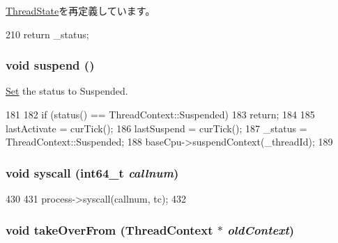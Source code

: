 \hyperlink{structThreadState_a2ad9e92a82d6f783b3061584729c2f4a}{ThreadState}を再定義しています。


\begin{DoxyCode}
210 { return _status; }
\end{DoxyCode}
\hypertarget{classSimpleThread_a3605b58fb45d69d498721bc2f2a14b1c}{
\subsubsection[{suspend}]{\setlength{\rightskip}{0pt plus 5cm}void suspend ()}}
\label{classSimpleThread_a3605b58fb45d69d498721bc2f2a14b1c}


\hyperlink{classSet}{Set} the status to Suspended. 


\begin{DoxyCode}
181 {
182     if (status() == ThreadContext::Suspended)
183         return;
184 
185     lastActivate = curTick();
186     lastSuspend = curTick();
187     _status = ThreadContext::Suspended;
188     baseCpu->suspendContext(_threadId);
189 }
\end{DoxyCode}
\hypertarget{classSimpleThread_a36e0b96120fcbbc2ee8699158f7be5c2}{
\subsubsection[{syscall}]{\setlength{\rightskip}{0pt plus 5cm}void syscall (int64\_\-t {\em callnum})}}
\label{classSimpleThread_a36e0b96120fcbbc2ee8699158f7be5c2}



\begin{DoxyCode}
430     {
431         process->syscall(callnum, tc);
432     }
\end{DoxyCode}
\hypertarget{classSimpleThread_a5811640aa3008d2916f3d3aba621b82d}{
\subsubsection[{takeOverFrom}]{\setlength{\rightskip}{0pt plus 5cm}void takeOverFrom ({\bf ThreadContext} $\ast$ {\em oldContext})}}
\label{classSimpleThread_a5811640aa3008d2916f3d3aba621b82d}



